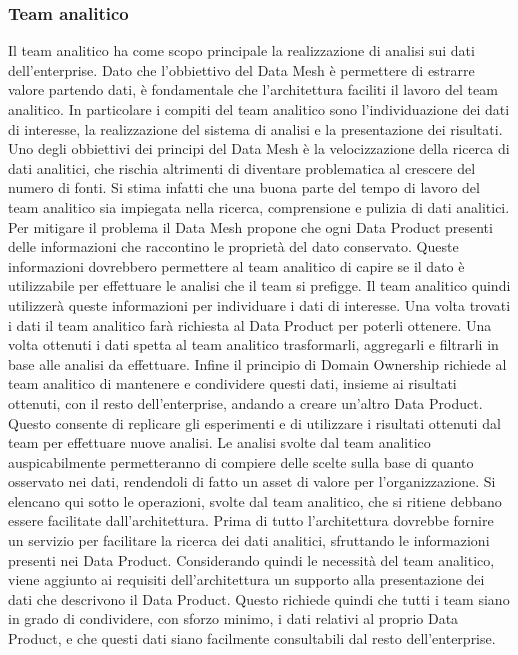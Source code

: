 \documentclass[12pt]{report}
\begin{document}
\subsubsection{Team analitico}
Il team analitico ha come scopo principale la realizzazione di analisi sui dati dell'enterprise.
Dato che l'obbiettivo del Data Mesh è permettere di estrarre valore partendo dati, è fondamentale che l'architettura faciliti il lavoro del team analitico.
In particolare i compiti del team analitico sono l'individuazione dei dati di interesse, la realizzazione del sistema di analisi e la presentazione dei risultati. 
Uno degli obbiettivi dei principi del Data Mesh è la velocizzazione della ricerca di dati analitici, che rischia altrimenti di  diventare problematica al crescere del numero di fonti. 
Si stima infatti che una buona parte del tempo di lavoro del team analitico sia impiegata nella ricerca, comprensione e pulizia di dati analitici.
Per mitigare il problema il Data Mesh propone che ogni Data Product presenti delle informazioni che raccontino le proprietà del dato conservato.
Queste informazioni dovrebbero permettere al team analitico di capire se il dato è utilizzabile per effettuare le analisi che il team si prefigge. 
Il team analitico quindi utilizzerà queste informazioni per individuare i dati di interesse. 
Una volta trovati i dati il team analitico farà richiesta al Data Product per poterli ottenere.
Una volta ottenuti i dati spetta al team analitico trasformarli, aggregarli e filtrarli in base alle analisi da effettuare.
Infine il principio di Domain Ownership richiede al team analitico di mantenere e condividere questi dati, insieme ai risultati ottenuti, con il resto dell'enterprise, andando a creare un'altro Data Product.
Questo consente di replicare gli esperimenti e di utilizzare i risultati ottenuti dal team per effettuare nuove analisi.
Le analisi svolte dal team analitico auspicabilmente permetteranno di compiere delle scelte sulla base di quanto osservato nei dati, rendendoli di fatto un asset di valore per l'organizzazione.
Si elencano qui sotto le operazioni, svolte dal team analitico, che si ritiene debbano essere facilitate dall'architettura.
Prima di tutto l'architettura dovrebbe fornire un servizio per facilitare la ricerca dei dati analitici, sfruttando le informazioni presenti nei Data Product.
Considerando quindi le necessità del team analitico, viene aggiunto ai requisiti dell'architettura un supporto alla presentazione dei dati che descrivono il Data Product. 
Questo richiede quindi che tutti i team siano in grado di condividere, con sforzo minimo, i dati relativi al proprio Data Product, e che questi dati siano facilmente consultabili dal resto dell'enterprise.
\end{document}
